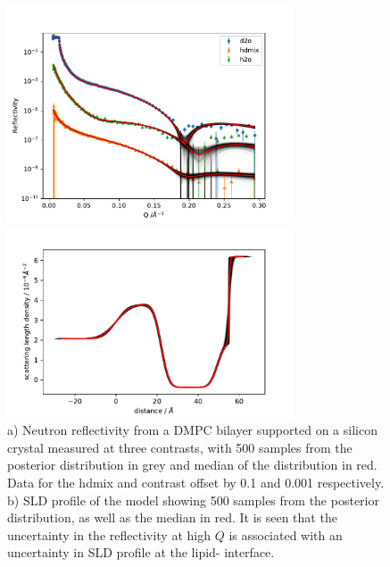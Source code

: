 \documentclass[pdf,preprint]{iucr}
\begin{document}
\begin{figure}
\centering
\label{fig:global_fit}%
\includegraphics[width=85mm]{./supporting_information/global_fit.pdf}%

\includegraphics[width=85mm]{./supporting_information/d2o_sld_spread.pdf}

\caption{a) Neutron reflectivity from a DMPC bilayer supported on a silicon crystal measured at three contrasts, with 500 samples from the posterior distribution in grey and median of the distribution in red. Data for the hdmix and  contrast offset by 0.1 and 0.001 respectively. b) SLD profile of the  model showing 500 samples from the posterior distribution, as well as the median in red. It is seen that the uncertainty in the reflectivity at high $Q$ is associated with an uncertainty in SLD profile at the lipid- interface.}
\end{figure}
\end{document}
